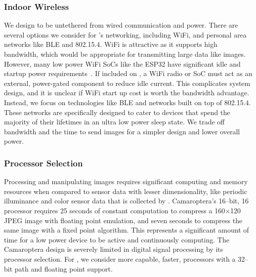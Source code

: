 \subsubsection{Indoor Wireless}
We design \namec to be untethered from wired communication and power. There are several options we consider for \namec's networking, including WiFi, and personal area networks like BLE and 802.15.4. WiFi is attractive as it supports high bandwidth, which would be appropriate for transmitting large data like images. However, many low power WiFi SoCs like the ESP32 have significant idle and startup power requirements~\cite{esp32}. 
If included on \namec, a WiFi radio or SoC must act as an external, power-gated component to reduce idle current. 
This complicates system design, and it is unclear if WiFi start up cost is worth the bandwidth advantage. 
Instead, we focus on technologies like BLE and networks built on top of 802.15.4. 
These networks are specifically designed to cater to devices that spend the majority of their lifetimes in an ultra low power sleep state. 
We trade off bandwidth and the time to send images for a simpler design and lower overall power.
 

\subsubsection{Processor Selection}
Processing and manipulating images requires significant computing and memory resources when compared to sensor data with lesser dimensionality, like periodic illuminance and color sensor data that is collected by \name.
Camaroptera's 16--bit, 16\ssi{\mega\hertz} processor requires 25 seconds of constant computation to compress a 160$\times$120 JPEG image with floating point emulation, and seven seconds to compress the same image with a fixed point algorithm.
This represents a significant amount of time for a low power device to be active and continuously computing.
The Camaroptera design is severely limited in digital signal processing by its processor selection. 
For \namec, we consider more capable, faster, processors with a 32--bit path and floating point support. 

